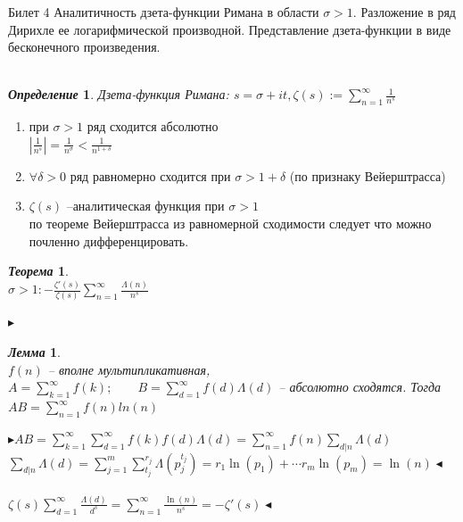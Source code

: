 \documentclass[a4paper,12pt]{article}
\newtheorem{deff}{\textit{Определение}}
\newtheorem{teo}{\textit{Теорема}}
\newtheorem{lem}{\textit{Лемма}}
\newcommand{\q}{\quad}
\newcommand{\pb}{\blacktriangleright}
\newcommand{\pe}{\blacktriangleleft}
\newcommand{\SL}{\sum\limits}
\begin{document}
\newpage
\begin{mybox}{\hypertarget{bil4}{Билет 4}}
Аналитичность дзета-функции Римана в области $\sigma > 1$. Разложение в ряд Дирихле ее логарифмической производной. Представление дзета-функции в виде бесконечного произведения.\q\\\q\\
\begin{deff}
Дзета-функция Римана: $s = \sigma + it, \zeta (s) := \SL_{n=1}^\infty \frac{1}{n^s}$
\end{deff}
\begin{enumerate}
    \item при $\sigma > 1$ ряд сходится абсолютно \\
    $\left|\frac{1}{n^s}\right| = \frac{1}{n^\sigma}<\frac{1}{n^{1 + \delta}}$
    \item $\forall \delta > 0$ ряд равномерно сходится при $\sigma>1+\delta$ (по признаку Вейерштрасса)
    \item $\zeta(s)$ --аналитическая функция при $\sigma > 1$\\
    по теореме Вейерштрасса из равномерной сходимости следует что можно почленно дифференцировать.
\end{enumerate}

\begin{teo}\q\\
$\sigma > 1: -\frac{\zeta'(s)}{\zeta(s)}  \SL_{n=1}^\infty \frac{\Lambda(n)}{n^s} $
\end{teo}
$\pb$
\begin{lem}\q\\
$f(n)$ -- вполне мультипликативная, $A = \SL_{k=1}^\infty f(k);\q\q B = \SL_{d=1}^\infty f(d)\Lambda(d)$ -- абсолютно сходятся. Тогда $AB = \SL_{n=1}^\infty f(n) ln(n)$
\end{lem}
$\pb AB = \SL_{k=1}^\infty \SL_{d=1}^\infty f(k)f(d)\Lambda(d) = \SL_{n=1}^\infty f(n) \SL_{d|n} \Lambda(d)$\\
$\SL_{d|n} \Lambda(d) = \SL_{j=1}^m\SL_{t_j}^{r_j} \Lambda(p_j^{t_j}) = r_1 \ln(p_1) + \cdots r_m \ln(p_m) = \ln(n) \pe$\\\q\\
$\zeta(s) \SL_{d=1}^\infty\frac{\Lambda(d)}{d^s} = \SL_{n=1}^\infty \frac{\ln(n)}{n^s} = -\zeta'(s) \pe$\\\q\\


\end{mybox}
\end{document}
